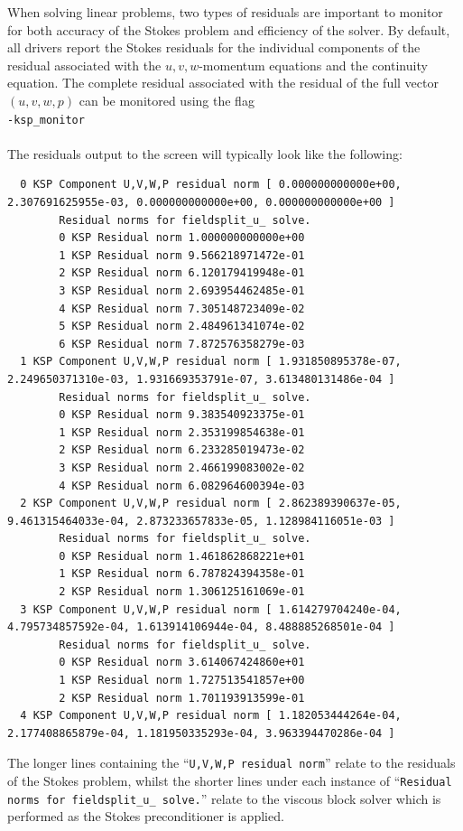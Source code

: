 \documentclass[paper=a4, fontsize=10pt,twoside]{scrartcl}
\newcommand{\shellcmd}[1]{\\\indent\indent\texttt{\hspace{5mm}\footnotesize #1}\\}
\begin{document}
When solving linear problems, two types of residuals are important to monitor for both accuracy of the Stokes problem and efficiency of the solver.
By default, all drivers report the Stokes residuals for the individual components of the residual associated with the $u,v,w$-momentum equations and the continuity equation. The complete residual associated with the residual of the full vector $(u,v,w,p)$ can be monitored using the flag
\shellcmd{-ksp\_monitor}
\\[8pt]
The residuals output to the screen will typically look like the following:
\begingroup
    \fontsize{6.5pt}{6.5pt}\selectfont
	\begin{verbatim}
  0 KSP Component U,V,W,P residual norm [ 0.000000000000e+00, 2.307691625955e-03, 0.000000000000e+00, 0.000000000000e+00 ]
        Residual norms for fieldsplit_u_ solve.
        0 KSP Residual norm 1.000000000000e+00 
        1 KSP Residual norm 9.566218971472e-01 
        2 KSP Residual norm 6.120179419948e-01 
        3 KSP Residual norm 2.693954462485e-01 
        4 KSP Residual norm 7.305148723409e-02 
        5 KSP Residual norm 2.484961341074e-02 
        6 KSP Residual norm 7.872576358279e-03 
  1 KSP Component U,V,W,P residual norm [ 1.931850895378e-07, 2.249650371310e-03, 1.931669353791e-07, 3.613480131486e-04 ]
        Residual norms for fieldsplit_u_ solve.
        0 KSP Residual norm 9.383540923375e-01 
        1 KSP Residual norm 2.353199854638e-01 
        2 KSP Residual norm 6.233285019473e-02 
        3 KSP Residual norm 2.466199083002e-02 
        4 KSP Residual norm 6.082964600394e-03 
  2 KSP Component U,V,W,P residual norm [ 2.862389390637e-05, 9.461315464033e-04, 2.873233657833e-05, 1.128984116051e-03 ]
        Residual norms for fieldsplit_u_ solve.
        0 KSP Residual norm 1.461862868221e+01 
        1 KSP Residual norm 6.787824394358e-01 
        2 KSP Residual norm 1.306125161069e-01 
  3 KSP Component U,V,W,P residual norm [ 1.614279704240e-04, 4.795734857592e-04, 1.613914106944e-04, 8.488885268501e-04 ]
        Residual norms for fieldsplit_u_ solve.
        0 KSP Residual norm 3.614067424860e+01 
        1 KSP Residual norm 1.727513541857e+00 
        2 KSP Residual norm 1.701193913599e-01 
  4 KSP Component U,V,W,P residual norm [ 1.182053444264e-04, 2.177408865879e-04, 1.181950335293e-04, 3.963394470286e-04 ]
	\end{verbatim}
\endgroup
The longer lines containing the ``{\tt U,V,W,P residual norm}'' relate to the residuals of the Stokes problem, whilst the shorter lines under each instance of ``{\tt Residual norms for fieldsplit\_u\_ solve.}'' relate to the viscous block solver which is performed as the Stokes preconditioner is applied.
\end{document}
